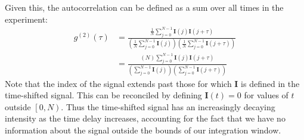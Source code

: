 \documentclass{article}
\newcommand{\parens}[1]{\ensuremath{\left( #1 \right)}}
\newcommand{\gn}[1]{\ensuremath{g^{(#1)}}}
\renewcommand{\vec}{\boldsymbol}
\newcommand{\closedopenrange}[2]{\ensuremath{\left[#1, #2\right)}}
\begin{document}
Given this, the autocorrelation can be defined as a sum over all times in the experiment:
\begin{align}
\gn{2}(\tau) &= \frac{\frac{1}{N}\sum_{j=0}^{N-1}{\vec{I}(j)\vec{I}(j+\tau)}}
                     {\parens{\frac{1}{N}\sum_{j=0}^{N-1}{\vec{I}(j)}}
                      \parens{\frac{1}{N}\sum_{j=0}^{N-1}{\vec{I}(j+\tau)}}} \nonumber \\
\label{eq:discrete_g2} &= \frac{\parens{N}\sum_{j=0}^{N-1}{\vec{I}(j)\vec{I}(j+\tau)}}
                    {\parens{\sum_{j=0}^{N-1}{\vec{I}(j)}}
                     \parens{\sum_{j=0}^{N-1}{\vec{I}(j+\tau)}}}
\end{align}
Note that the index of the signal extends past those for which $\vec{I}$ is defined in the time-shifted signal. This can be reconciled by defining $\vec{I}(t)=0$ for values of $t$ outside \closedopenrange{0}{N}. Thus the time-shifted signal has an increasingly decaying intensity as the time delay increases, accounting for the fact that we have no information about the signal outside the bounds of our integration window.
\end{document}
